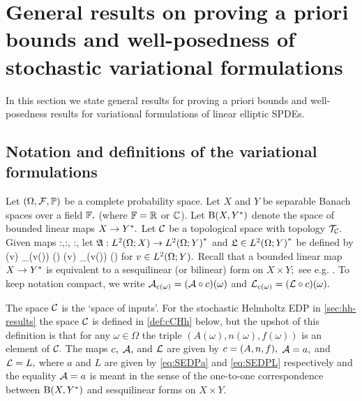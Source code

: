 \section{General results on proving a priori bounds and well-posedness of stochastic variational formulations}\label{sec:gen-framework}\label{sec:general}
In this section we state general results for proving a priori bounds and well-posedness results for variational formulations of linear elliptic SPDEs.

\subsection{Notation and definitions of the variational formulations}\label{sec:notdef}
Let $\OFP$ be a complete probability space. Let $X$ and $Y$ be separable Banach spaces over a field $\mathbb F,$ (where $\mathbb F = \mathbb R$ or $\mathbb C$).
Let $\homspace$ denote the space of bounded linear maps $X\rightarrow Y^{*}.$ Let $\mathcal C$ be a topological space with topology $\mathcal T_{\mathcal C}.$ Given maps
\beqs
\coeff:\Omega\rightarrow\cC,\quad\toform:\cC \rightarrow \homspace,\quad{} \rhs:\cC \rightarrow \Ys,
\eeqs let $\SAc:\LtOX \rightarrow \LtOYas$ and  $\SLc \in \LtOYas$ be defined by
\beq\label{eq:SA}
(v) \de \int_\Omega {}\big(v(\omega)\big) \dd\PP(\omega) \quad{} \quad 
\SLc(v) \de \int_\Omega \Lcomega\big(v(\omega)\big) \dd \PP(\omega)
\eeq
for $v \in \LtOY.$ Recall that a bounded linear map $X\rightarrow Y^{*}$ is equivalent to a sesquilinear (or bilinear) form on $X \times Y;$ see e.g. \cite[Lemma 2.1.38]{SaSc:11}. To keep notation compact, we write $\Acomega=(\toform \circ c)(\omega)$ and $\Lcomega=(\rhs\circ c)(\omega).$



The space $\mathcal C$ is the `space of inputs'. For the stochastic Helmholtz EDP in \cref{sec:hh-results} the space $\mathcal C$ is defined in \cref{def:cCHh} below, but the upshot of this definition is that for any $\omega \in \Omega$ the triple $(A(\omega),n(\omega),f(\omega))$ is an element of $\mathcal C.$
The maps $c,$ $\mathcal A,$ and $\mathcal L$ are given by $\coeff = \mleft(A,n,f\mright),$ $\mathcal A = a,$ and $\mathcal L = L,$ where $a$ and $L$ are given by \eqref{eq:SEDPa} and \eqref{eq:SEDPL} respectively and the equality $\mathcal A=a$ is meant in the sense of the one-to-one correspondence between $\homspace$ and sesquilinear forms on $X\times Y.$
\ere

